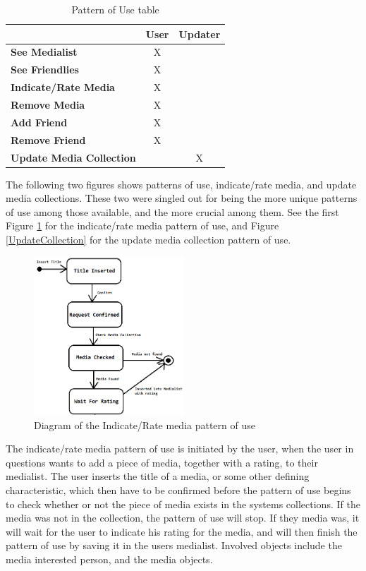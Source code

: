 \begin{table}[htb]
\centering
\begin{tabular}{|l|c|c|} \hline
	  & \textbf{User} & \textbf{Updater} \\ \hline
	\textbf{See Medialist} & X &  \\ \hline
	\textbf{See Friendlies} & X &  \\ \hline
	\textbf{Indicate/Rate Media} & X &  \\ \hline
	\textbf{Remove Media} & X &  \\ \hline
	\textbf{Add Friend} & X &  \\ \hline
	\textbf{Remove Friend} & X &  \\ \hline
	\textbf{Update Media Collection} &  & X \\ \hline
\end{tabular}
\caption{Pattern of Use table}
\label{UseTable}
\end{table}

The following two figures shows patterns of use, indicate/rate media, and update media collections. These two were singled out for being the more unique patterns of use among those available, and the more crucial among them. See the first Figure \ref{IndicateMedia} for the indicate/rate media pattern of use, and Figure \ref{UpdateCollection} for the update media collection pattern of use.

\begin{figure}[htb]
\centering
\includegraphics[width=0.5\textwidth]{Images/IndicateMedia.png}
\caption{Diagram of the Indicate/Rate media pattern of use}
\label{IndicateMedia}
\end{figure}

The indicate/rate media pattern of use is initiated by the user, when the user in questions wants to add a piece of media, together with a rating, to their medialist. The user inserts the title of a media, or some other defining characteristic, which then have to be confirmed before the pattern of use begins to check whether or not the piece of media exists in the systems collections. If the media was not in the collection, the pattern of use will stop. If they media was, it will wait for the user to indicate his rating for the media, and will then finish the pattern of use by saving it in the users medialist. Involved objects include the media interested person, and the media objects.

